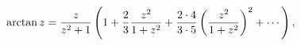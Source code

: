 \[\mathop{\mathrm{arctan}\/}\nolimits z=\frac{z}{z^{2}+1}\*\left(1+\frac{2}{3}%
\frac{z^{2}}{1+z^{2}}+\frac{2\cdot 4}{3\cdot 5}\left(\frac{z^{2}}{1+z^{2}}%
\right)^{2}+\cdots\right),\]